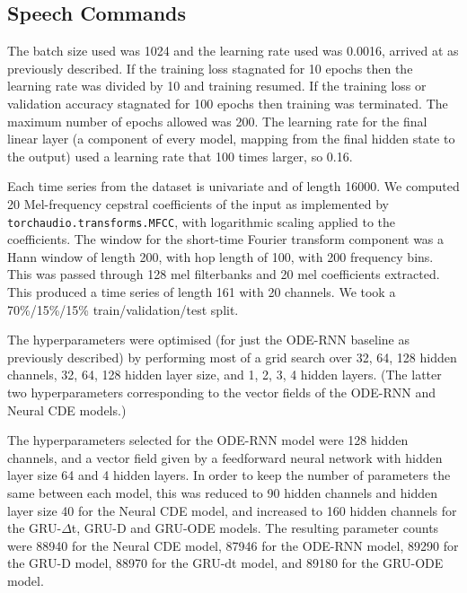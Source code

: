 \documentclass{article}
\theoremstyle{plain}
\theoremstyle{definition}
\begin{document}
	\subsection{Speech Commands}\label{appendix:speechcommands}
	The batch size used was 1024 and the learning rate used was 0.0016, arrived at as previously described. If the training loss stagnated for 10 epochs then the learning rate was divided by 10 and training resumed. If the training loss or validation accuracy stagnated for 100 epochs then training was terminated. The maximum number of epochs allowed was 200. The learning rate for the final linear layer (a component of every model, mapping from the final hidden state to the output) used a learning rate that 100 times larger, so 0.16.
	
	Each time series from the dataset is univariate and of length 16000. We computed 20 Mel-frequency cepstral coefficients of the input as implemented by \texttt{torchaudio.transforms.MFCC}, with logarithmic scaling applied to the coefficients. The window for the short-time Fourier transform component was a Hann window of length 200, with hop length of 100, with 200 frequency bins. This was passed through 128 mel filterbanks and 20 mel coefficients extracted. This produced a time series of length 161 with 20 channels. We took a 70\%/15\%/15\% train/validation/test split.
	
	The hyperparameters were optimised (for just the ODE-RNN baseline as previously described) by performing most of a grid search over 32, 64, 128 hidden channels, 32, 64, 128 hidden layer size, and 1, 2, 3, 4 hidden layers. (The latter two hyperparameters corresponding to the vector fields of the ODE-RNN and Neural CDE models.)
	
	The hyperparameters selected for the ODE-RNN model were 128 hidden channels, and a vector field given by a feedforward neural network with hidden layer size 64 and 4 hidden layers. In order to keep the number of parameters the same between each model, this was reduced to 90 hidden channels and hidden layer size 40 for the Neural CDE model, and increased to 160 hidden channels for the GRU-$\Delta$t, GRU-D and GRU-ODE models. The resulting parameter counts were 88940 for the Neural CDE model, 87946 for the ODE-RNN model, 89290 for the GRU-D model, 88970 for the GRU-dt model, and 89180 for the GRU-ODE model.
\end{document}
